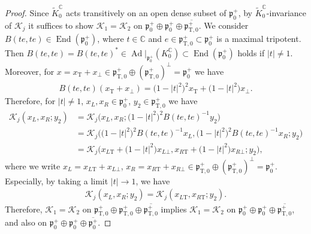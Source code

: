 \documentclass[pdftex]{sigma}
\numberwithin{equation}{section}
\newcommand{\BC}{\mathbb{C}}
\newcommand{\fp}{\mathfrak{p}}
\newcommand{\cK}{\mathcal{K}}
\newcommand{\rT}{\mathrm{T}}
\newcommand{\End}{\operatorname{End}}
\begin{document}
\begin{proof}
Since $\tilde{K}^\BC_0$ acts transitively on an open dense subset of $\fp^+_0$, by $\tilde{K}^\BC_0$-invariance of $\cK_j$
it suffices to show $\cK_1=\cK_2$ on $\fp^+_0\oplus\fp^+_0\oplus\overline{\fp^+_{\rT,0}}$.
We consider $B(te,te)\in\End(\fp^+_0)$, where $t\in\BC$ and $e\in\fp^+_{\rT,0}\subset\fp^+_0$ is a maximal tripotent.
Then $B(te,te)=B(te,te)^*\in \operatorname{Ad}|_{\fp^+_0}(K^\BC_0)\subset\End(\fp^+_0)$ holds if $|t|\ne 1$.
Moreover, for $x=x_\rT+x_\bot\in\fp^+_{\rT,0}\oplus(\fp^+_{\rT,0})^\bot=\fp^+_0$ we have
\begin{gather*} B(te,te)(x_\rT+x_\bot)=\big(1-|t|^2\big)^2x_\rT+\big(1-|t|^2\big)x_\bot. \end{gather*}
Therefore, for $|t|\ne 1$, $x_L,x_R\in\fp^+_0$, $y_2\in\fp^+_{\rT,0}$ we have
\begin{align*}
\cK_j(x_L,x_R;y_2)&=\cK_j\big(x_L,x_R;\big(1-|t|^2\big)^2B(te,te)^{-1}y_2\big) \\
&=\cK_j\big(\big(1-|t|^2\big)^2B(te,te)^{-1}x_L,\big(1-|t|^2\big)^2B(te,te)^{-1}x_R;y_2\big) \\
&=\cK_j\big(x_{L\rT}+\big(1-|t|^2\big)x_{L\bot},x_{R\rT}+\big(1-|t|^2\big)x_{R\bot};y_2\big),
\end{align*}
where we write $x_L=x_{L\rT}+x_{L\bot}$, $x_R=x_{R\rT}+x_{R\bot}\in\fp^+_{\rT,0}\oplus(\fp^+_{\rT,0})^\bot=\fp^+_0$.
Especially, by taking a limit $|t|\to 1$, we have
\begin{gather*} \cK_j(x_L,x_R;y_2)=\cK_j (x_{L\rT},x_{R\rT};y_2 ). \end{gather*}
Therefore, $\cK_1=\cK_2$ on $\fp^+_{\rT,0}\oplus\fp^+_{\rT,0}\oplus\overline{\fp^+_{\rT,0}}$ implies
$\cK_1=\cK_2$ on $\fp^+_0\oplus\fp^+_0\oplus\overline{\fp^+_{\rT,0}}$, and also on $\fp^+_0\oplus\fp^+_0\oplus\overline{\fp^+_0}$.
\end{proof}
\end{document}
